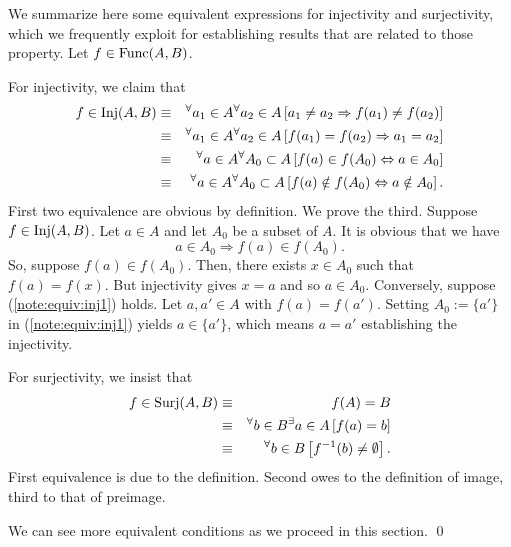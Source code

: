 \documentclass[a4paper,12pt]{article}
\begin{document}
\begin{rem}
	We summarize here some equivalent expressions for injectivity and surjectivity,
	which we frequently exploit for establishing results that are related to those property.
	Let
	\( f \in \mathrm{Func}(A,B) \).
	
	For injectivity, we claim that
	\begin{eqnarray}
		f \in \mathrm{Inj}(A,B)
		&\equiv& 
		{}^{\forall}  a_1 \in A
		{}^{\forall}  a_2 \in A
		\left[ a_1 \neq a_2 \Rightarrow f(a_1) \neq  f(a_2) \right]\notag\\
		&\equiv&
		{}^{\forall}  a_1 \in A
		{}^{\forall}  a_2 \in A
		\left[ f(a_1) = f(a_2) \Rightarrow a_1 =a_2 \right]\notag\\
		&\equiv&
		{}^{\forall}  a \in A
		{}^{\forall}  A_0 \subset A
		\left[ f(a)\in f(A_0) \Leftrightarrow a \in A_0 \right]\label{note:equiv:inj1}\\
		&\equiv&
		{}^{\forall}  a \in A
		{}^{\forall}  A_0 \subset A
		\left[ f(a)\notin f(A_0) \Leftrightarrow a \notin A_0 \right].
	\end{eqnarray}
	First two equivalence are obvious by definition.
	We prove the third.
	Suppose 
	\( f \in \mathrm{Inj}(A,B) \).
	Let
	\( a \in A \)
	and let
	\( A_0 \)
	be a subset of
	\( A \).
	It is obvious that  we have
	\begin{equation*}
		a \in A_0 \Rightarrow f(a)\in f(A_0).
	\end{equation*}
	So, suppose 
	\( f(a)\in f(A_0) \).
	Then, there exists
	\( x \in A_0 \)
	such that
	\( f(a) = f(x) \).
	But injectivity gives
	\( x=a \)
	and so
	\( a \in A_0\).
	Conversely, suppose (\ref{note:equiv:inj1}) holds.
	Let
	\( a,a' \in A \)
	with
	\( f(a) = f(a') \).
	Setting
	\( A_0 := \{a'\} \)
	in (\ref{note:equiv:inj1})
	yields
	\( a\in \{a'\} \),
	which means
	\( a=a' \)
	establishing the injectivity.
	
	For surjectivity, we insist that
	\begin{eqnarray*}
		f \in \mathrm{Surj}(A,B)
		&\equiv&
		f(A)=B\\
		&\equiv&
		{}^{\forall} b \in B
		{}^{\exists} a \in A
		\left[ f(a)=b \right]\\
		&\equiv&
		{}^{\forall} b \in B
		\left[f ^{-1}(b) \neq \emptyset \right].
	\end{eqnarray*}
	First equivalence is due to the definition.
	Second owes to the definition of image,
	third to that of preimage.
	
	We can see more equivalent conditions as we proceed in this section.
	\qed\end{rem}
\end{document}
